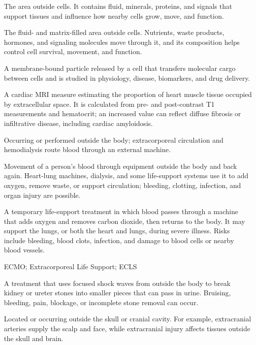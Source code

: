  The area outside cells. It contains fluid, minerals, proteins, and signals that support tissues and influence how nearby cells grow, move, and function.

 The fluid- and matrix-filled area outside cells. Nutrients, waste products, hormones, and signaling molecules move through it, and its composition helps control cell survival, movement, and function.

 A membrane-bound particle released by a cell that transfers molecular cargo between cells and is studied in physiology, disease, biomarkers, and drug delivery.

 A cardiac MRI measure estimating the proportion of heart muscle tissue occupied by extracellular space. It is calculated from pre- and post-contrast T1 measurements and hematocrit; an increased value can reflect diffuse fibrosis or infiltrative disease, including cardiac amyloidosis.

 Occurring or performed outside the body; extracorporeal circulation and hemodialysis route blood through an external machine.

 Movement of a person's blood through equipment outside the body and back again. Heart-lung machines, dialysis, and some life-support systems use it to add oxygen, remove waste, or support circulation; bleeding, clotting, infection, and organ injury are possible.

 A temporary life-support treatment in which blood passes through a machine that adds oxygen and removes carbon dioxide, then returns to the body. It may support the lungs, or both the heart and lungs, during severe illness. Risks include bleeding, blood clots, infection, and damage to blood cells or nearby blood vessels.

\synonyms
ECMO; Extracorporeal Life Support; ECLS

 A treatment that uses focused shock waves from outside the body to break kidney or ureter stones into smaller pieces that can pass in urine. Bruising, bleeding, pain, blockage, or incomplete stone removal can occur.

 Located or occurring outside the skull or cranial cavity. For example, extracranial arteries supply the scalp and face, while extracranial injury affects tissues outside the skull and brain.

